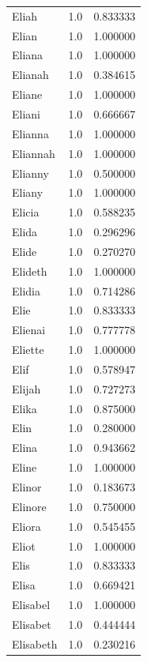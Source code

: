 \documentclass[
  letterpaper,
  DIV=11,
  numbers=noendperiod]{scrreprt}
\begin{document}
\begin{tabular}{lrr}
Eliah           &   1.0 &   0.833333 \\
Elian           &   1.0 &   1.000000 \\
Eliana          &   1.0 &   1.000000 \\
Elianah         &   1.0 &   0.384615 \\
Eliane          &   1.0 &   1.000000 \\
Eliani          &   1.0 &   0.666667 \\
Elianna         &   1.0 &   1.000000 \\
Eliannah        &   1.0 &   1.000000 \\
Elianny         &   1.0 &   0.500000 \\
Eliany          &   1.0 &   1.000000 \\
Elicia          &   1.0 &   0.588235 \\
Elida           &   1.0 &   0.296296 \\
Elide           &   1.0 &   0.270270 \\
Elideth         &   1.0 &   1.000000 \\
Elidia          &   1.0 &   0.714286 \\
Elie            &   1.0 &   0.833333 \\
Elienai         &   1.0 &   0.777778 \\
Eliette         &   1.0 &   1.000000 \\
Elif            &   1.0 &   0.578947 \\
Elijah          &   1.0 &   0.727273 \\
Elika           &   1.0 &   0.875000 \\
Elin            &   1.0 &   0.280000 \\
Elina           &   1.0 &   0.943662 \\
Eline           &   1.0 &   1.000000 \\
Elinor          &   1.0 &   0.183673 \\
Elinore         &   1.0 &   0.750000 \\
Eliora          &   1.0 &   0.545455 \\
Eliot           &   1.0 &   1.000000 \\
Elis            &   1.0 &   0.833333 \\
Elisa           &   1.0 &   0.669421 \\
Elisabel        &   1.0 &   1.000000 \\
Elisabet        &   1.0 &   0.444444 \\
Elisabeth       &   1.0 &   0.230216 \\

\end{tabular}
\end{document}
